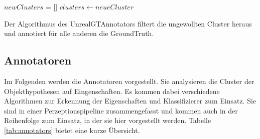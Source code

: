 \begin{algorithm}[H]
\BlankLine
$newClusters$ = []\;
$clusters \gets neueCluster$\;
\caption[UnrealGTAnnotator]{Der Algorithmus des UnrealGTAnnotators filtert die ungewollten Cluster heraus und annotiert für alle anderen die GroundTruth.}
\label{alg:UnrealGTAnnotator}
\end{algorithm}

\subsection{Annotatoren}

Im Folgenden werden die Annotatoren vorgestellt. Sie analysieren die Cluster der Objekthypothesen auf Eingenschaften. Es kommen dabei verschiedene Algorithmen zur Erkennung der Eigenschaften und Klassifizierer zum Einsatz. Sie sind in einer Perzeptionspipeline zusammengefasst und kommen auch in der Reihenfolge zum Einsatz, in der sie hier vorgestellt werden. Tabelle \ref{tab:annotators} bietet eine kurze Übersicht.

